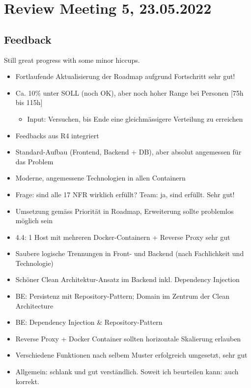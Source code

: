 \section{Review Meeting 5, 23.05.2022}

\subsection{Feedback}
Still great progress with some minor hiccups.

\begin{itemize}
    \item Fortlaufende Aktualisierung der Roadmap aufgrund Fortschritt \textrightarrow sehr gut!
    \item Ca. 10\% unter SOLL (noch OK), aber noch hoher Range bei Personen [75h bis 115h]
    \begin{itemize}
        \item Input: Versuchen, bis Ende eine gleichmässigere Verteilung zu erreichen
    \end{itemize}
    \item Feedbacks aus R4 integriert
    \item Standard-Aufbau (Frontend, Backend + DB), aber absolut angemessen für das Problem
    \item Moderne, angemessene Technologien in allen Containern
    \item Frage: sind alle 17 NFR wirklich erfüllt? \textrightarrow Team: ja, sind erfüllt. \textrightarrow Sehr gut!
    \item Umsetzung gemäss Priorität in Roadmap, Erweiterung sollte problemlos möglich sein
    \item 4.4: 1 Host mit mehreren Docker-Containern + Reverse Proxy \textrightarrow sehr gut
    \item Saubere logische Trennungen in Front- und Backend (nach Fachlichkeit und Technologie)
    \item Schöner Clean Architektur-Ansatz im Backend inkl. Dependency Injection
    \item BE: Persistenz mit Repository-Pattern; Domain im Zentrum der Clean Architecture
    \item BE: Dependency Injection \& Repository-Pattern
    \item Reverse Proxy + Docker Container sollten horizontale Skalierung erlauben
    \item Verschiedene Funktionen nach selbem Muster erfolgreich umgesetzt, sehr gut
    \item Allgemein: schlank und gut verständlich. Soweit ich beurteilen kann: auch korrekt.

\end{itemize}
